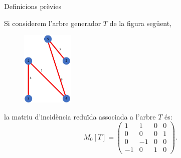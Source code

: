 \documentclass{beamer}
\begin{document}
\begin{frame}{Definicions prèvies}
\begin{exampleblock}{}
  Si considerem l'arbre generador $T$ de la figura següent,
    \begin{figure}
          \centering
          \includegraphics[width=2.45cm]{imatges/exemple2.jpg}
      \end{figure}\pause
      la matriu d'incidència reduïda associada a l'arbre $T$ és:
        $$M_0[T]=
        \begin{pmatrix}
            1 & 1 & 0 & 0 \\
            0 & 0 & 0 & 1 \\
            0 & -1 & 0 & 0 \\
            -1 & 0 & 1 & 0
        \end{pmatrix}.
        $$
\end{exampleblock}
\end{frame}
\end{document}
